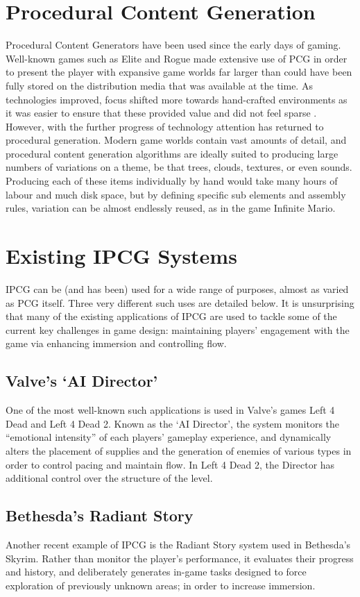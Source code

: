 \documentclass[a4paper,oneside,12pt,openany]{memoir}
\begin{document}
\section{Procedural Content Generation}
Procedural Content Generators have been used since the early days of gaming. Well-known games such as Elite and Rogue made extensive use of PCG in order to present the player with expansive game worlds far larger than could have been fully stored on the distribution media that was available at the time. As technologies improved, focus shifted more towards hand-crafted environments as it was easier to ensure that these provided value and did not feel sparse \cite{charbitat}. However, with the further progress of technology attention has returned to procedural generation. Modern game worlds contain vast amounts of detail, and procedural content generation algorithms are ideally suited to producing large numbers of variations on a theme, be that trees, clouds, textures, or even sounds. Producing each of these items individually by hand would take many hours of labour and much disk space, but by defining specific sub elements and assembly rules, variation can be almost endlessly reused, as in the game Infinite Mario.%

\section{Existing IPCG Systems}
IPCG can be (and has been) used for a wide range of purposes, almost as varied as PCG itself. Three very different such uses are detailed below. It is unsurprising that many of the existing applications of IPCG are used to tackle some of the current key challenges in game design: maintaining players' engagement with the game via enhancing immersion and controlling flow\cite{flow}. 
\subsection{Valve's `AI Director'}
One of the most well-known such applications is used in Valve's games Left 4 Dead and Left 4 Dead 2. Known as the `AI Director', the system monitors the ``emotional intensity'' of each players' gameplay experience, and dynamically alters the placement of supplies and the generation of enemies of various types in order to control pacing and maintain flow. In Left 4 Dead 2, the Director has additional control over the structure of the level\cite{valve}.
\newpage
\vspace*{1.4cm}
\subsection{Bethesda's Radiant Story}
Another recent example of IPCG is the Radiant Story system used in Bethesda's Skyrim. Rather than monitor the player's performance, it evaluates their progress and history, and deliberately generates in-game tasks designed to force exploration of previously unknown areas; in order to increase immersion.%
\end{document}
